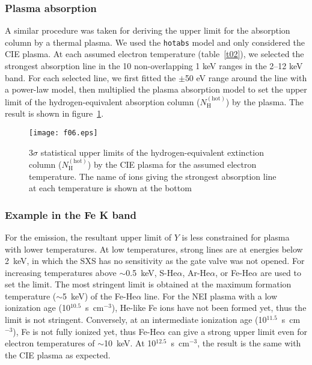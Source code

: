 \documentclass[]{pasj01}
\begin{document}
\subsubsection{Plasma absorption}\label{s3-1-3}
A similar procedure was taken for deriving the upper limit for the absorption column by
a thermal plasma. We used the \texttt{hotabs} model \citep{kallman01} and only
considered the CIE plasma. At each assumed electron temperature (table~\ref{t02}), we
selected the strongest absorption line in the 10 non-overlapping 1 keV ranges in the
2--12 keV band. For each selected line, we first fitted the $\pm$50 eV range around the
line with a power-law model, then multiplied the plasma absorption model to set the
upper limit of the hydrogen-equivalent absorption column
($N_{\mathrm{H}}^{\mathrm{(hot)}}$) by the plasma. The result is shown in
figure~\ref{f06}.

\begin{figure}
 \begin{center}
  \texttt{[image: f06.eps]}
 \end{center}
 \caption{3$\sigma$ statistical upper limits of the hydrogen-equivalent extinction column
 ($N_{\mathrm{H}}^{\mathrm{(hot)}}$) by the CIE plasma for the assumed electron
 temperature. The name of ions giving the strongest absorption line at each temperature
 is shown at the bottom}
 \label{f06}
\end{figure}

\subsubsection{Example in the Fe K band}\label{s3-1-4}
For the emission, the resultant upper limit of $Y$ is less constrained for plasma with
lower temperatures. At low temperatures, strong lines are at energies below 2~keV, in
which the SXS has no sensitivity as the gate valve was not opened. For increasing
temperatures above $\sim$0.5~keV, S-He$\alpha$, Ar-He$\alpha$, or Fe-He$\alpha$ are used
to set the limit. The most stringent limit is obtained at the maximum formation
temperature ($\sim$5~keV) of the Fe-He$\alpha$ line. For the NEI plasma with a low
ionization age (10$^{10.5}$~s~cm$^{-3}$), He-like Fe ions have not been formed yet, thus
the limit is not stringent. Conversely, at an intermediate ionization age
(10$^{11.5}$~s~cm$^{-3}$), Fe is not fully ionized yet, thus Fe-He$\alpha$ can give a
strong upper limit even for electron temperatures of $\sim$10~keV. At
10$^{12.5}$~s~cm$^{-3}$, the result is the same with the CIE plasma as expected.
\end{document}
